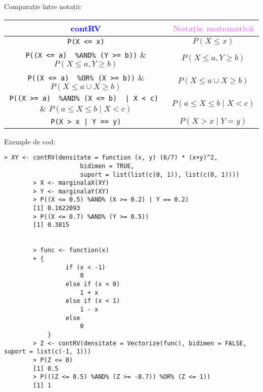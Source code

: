 \documentclass[12pt]{article}
\begin{document}
	Comparație între notații:
	\begin{center}
		\begin{tabular}{|| c | c ||}
			\hline
			\textcolor{blue}{contRV} & \textcolor{violet}{Notație matematică} \\
			
			\hline
			\lstinline|P(X <= x)| & $P(X \leq x)$ \\
			
			\hline
			\lstinline|P((X <= a)  %AND% (Y >= b))| & $P(X \leq a, Y \geq b)$ \\
			
			\hline
			\lstinline|P((X <= a)  %OR% (X >= b))| & $P(X \leq a \cup X \geq b)$ \\
			
			
			\hline
			\lstinline!P((X >= a)  %AND% (X <= b)  | X < c) ! & $P(a \leq X \leq b \mid X < c)$ \\
			
			\hline
			\lstinline!P(X > x | Y == y)! & $P(X > x \mid Y = y)$ \\
			
			\hline
			
		\end{tabular}
	\end{center}\vspace*{3\baselineskip}

	Exemple de cod:
	\begin{lstlisting}[numbers=none]
		> XY <- contRV(densitate = function (x, y) (6/7) * (x+y)^2,
		             bidimen = TRUE,
		             suport = list(list(c(0, 1)), list(c(0, 1))))
		> X <- marginalaX(XY)
		> Y <- marginalaY(XY)
		> P((X <= 0.5) %AND% (X >= 0.2) | Y == 0.2)
		[1] 0.1622093
		> P((X <= 0.7) %AND% (Y >= 0.5))
		[1] 0.3815
		
		
		> func <- function(x)
		+ {
			     if (x < -1)
			         0
			     else if (x < 0)
			         1 + x
			     else if (x < 1)
			         1 - x
			     else
			         0
			}
		> Z <- contRV(densitate = Vectorize(func), bidimen = FALSE, suport = list(c(-1, 1)))
		> P(Z <= 0)
		[1] 0.5
		> P(((Z <= 0.5) %AND% (Z >= -0.7)) %OR% (Z <= 1))
		[1] 1
	\end{lstlisting}
\end{document}
